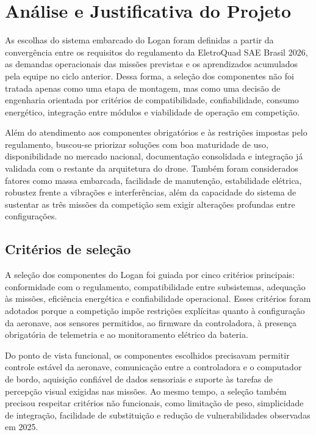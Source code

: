 \section{Análise e Justificativa do Projeto}

As escolhas do sistema embarcado do Logan foram definidas a partir da convergência entre os requisitos do regulamento da EletroQuad SAE Brasil 2026, as demandas operacionais das missões previstas e os aprendizados acumulados pela equipe no ciclo anterior. Dessa forma, a seleção dos componentes não foi tratada apenas como uma etapa de montagem, mas como uma decisão de engenharia orientada por critérios de compatibilidade, confiabilidade, consumo energético, integração entre módulos e viabilidade de operação em competição.

Além do atendimento aos componentes obrigatórios e às restrições impostas pelo regulamento, buscou-se priorizar soluções com boa maturidade de uso, disponibilidade no mercado nacional, documentação consolidada e integração já validada com o restante da arquitetura do drone. Também foram considerados fatores como massa embarcada, facilidade de manutenção, estabilidade elétrica, robustez frente a vibrações e interferências, além da capacidade do sistema de sustentar as três missões da competição sem exigir alterações profundas entre configurações.

\subsection{Critérios de seleção}

A seleção dos componentes do Logan foi guiada por cinco critérios principais: conformidade com o regulamento, compatibilidade entre subsistemas, adequação às missões, eficiência energética e confiabilidade operacional. Esses critérios foram adotados porque a competição impõe restrições explícitas quanto à configuração da aeronave, aos sensores permitidos, ao firmware da controladora, à presença obrigatória de telemetria e ao monitoramento elétrico da bateria.

Do ponto de vista funcional, os componentes escolhidos precisavam permitir controle estável da aeronave, comunicação entre a controladora e o computador de bordo, aquisição confiável de dados sensoriais e suporte às tarefas de percepção visual exigidas nas missões. Ao mesmo tempo, a seleção também precisou respeitar critérios não funcionais, como limitação de peso, simplicidade de integração, facilidade de substituição e redução de vulnerabilidades observadas em 2025.

